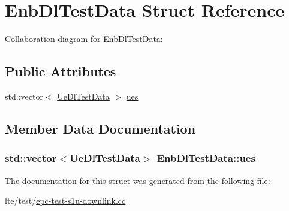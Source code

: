 \hypertarget{structEnbDlTestData}{}\section{Enb\+Dl\+Test\+Data Struct Reference}
\label{structEnbDlTestData}


Collaboration diagram for Enb\+Dl\+Test\+Data\+:
\subsection*{Public Attributes}
\begin{DoxyCompactItemize}
\item 
std\+::vector$<$ \hyperlink{structUeDlTestData}{Ue\+Dl\+Test\+Data} $>$ \hyperlink{structEnbDlTestData_a919da2f180c68423fc47ba8e1b088b13}{ues}
\end{DoxyCompactItemize}


\subsection{Member Data Documentation}
\subsubsection[{\texorpdfstring{ues}{ues}}]{\setlength{\rightskip}{0pt plus 5cm}std\+::vector$<${\bf Ue\+Dl\+Test\+Data}$>$ Enb\+Dl\+Test\+Data\+::ues}\hypertarget{structEnbDlTestData_a919da2f180c68423fc47ba8e1b088b13}{}\label{structEnbDlTestData_a919da2f180c68423fc47ba8e1b088b13}


The documentation for this struct was generated from the following file\+:\begin{DoxyCompactItemize}
\item 
lte/test/\hyperlink{epc-test-s1u-downlink_8cc}{epc-\/test-\/s1u-\/downlink.\+cc}\end{DoxyCompactItemize}
